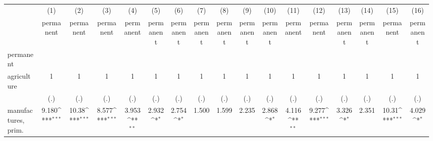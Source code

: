 {
\def\sym#1{\ifmmode^{#1}\else\(^{#1}\)\fi}
\begin{tabular}{l*{16}{c}}
\hline\hline
                    &\multicolumn{1}{c}{(1)}&\multicolumn{1}{c}{(2)}&\multicolumn{1}{c}{(3)}&\multicolumn{1}{c}{(4)}&\multicolumn{1}{c}{(5)}&\multicolumn{1}{c}{(6)}&\multicolumn{1}{c}{(7)}&\multicolumn{1}{c}{(8)}&\multicolumn{1}{c}{(9)}&\multicolumn{1}{c}{(10)}&\multicolumn{1}{c}{(11)}&\multicolumn{1}{c}{(12)}&\multicolumn{1}{c}{(13)}&\multicolumn{1}{c}{(14)}&\multicolumn{1}{c}{(15)}&\multicolumn{1}{c}{(16)}\\
                    &\multicolumn{1}{c}{permanent}&\multicolumn{1}{c}{permanent}&\multicolumn{1}{c}{permanent}&\multicolumn{1}{c}{permanent}&\multicolumn{1}{c}{permanent}&\multicolumn{1}{c}{permanent}&\multicolumn{1}{c}{permanent}&\multicolumn{1}{c}{permanent}&\multicolumn{1}{c}{permanent}&\multicolumn{1}{c}{permanent}&\multicolumn{1}{c}{permanent}&\multicolumn{1}{c}{permanent}&\multicolumn{1}{c}{permanent}&\multicolumn{1}{c}{permanent}&\multicolumn{1}{c}{permanent}&\multicolumn{1}{c}{permanent}\\
\hline
permanent           &                     &                     &                     &                     &                     &                     &                     &                     &                     &                     &                     &                     &                     &                     &                     &                     \\
agriculture         &           1         &           1         &           1         &           1         &           1         &           1         &           1         &           1         &           1         &           1         &           1         &           1         &           1         &           1         &           1         &           1         \\
                    &         (.)         &         (.)         &         (.)         &         (.)         &         (.)         &         (.)         &         (.)         &         (.)         &         (.)         &         (.)         &         (.)         &         (.)         &         (.)         &         (.)         &         (.)         &         (.)         \\
[1em]
manufactures, prim. &       9.180\sym{***}&       10.38\sym{***}&       8.577\sym{***}&       3.953\sym{**} &       2.932\sym{*}  &       2.754\sym{*}  &       1.500         &       1.599         &       2.235         &       2.868\sym{*}  &       4.116\sym{**} &       9.277\sym{***}&       3.326\sym{*}  &       2.351         &       10.31\sym{***}&       4.029\sym{*}  \\

\end{tabular}}
